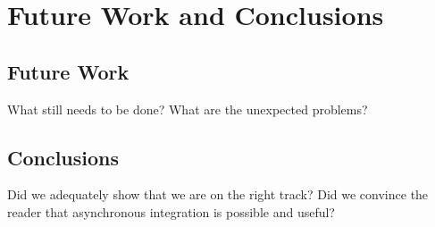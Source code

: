 \section{Future Work and Conclusions}
\label{section:conc}

\subsection{Future Work}

What still needs to be done?  What are the unexpected problems?

\subsection{Conclusions}

Did we adequately show that we are on the right track?
Did we convince the reader that asynchronous integration is possible and useful?


